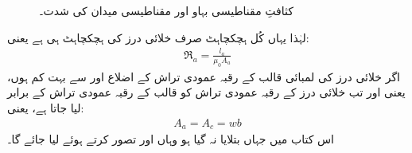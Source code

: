 \begin{figure}
%
\caption{کثافتِ مقناطیسی بہاو اور مقناطیسی میدان کی شدت۔}
\label{شکل_مقناطیسی__کثافت_مقناطیسی_بہاو_اور_شدت}
\end{figure}
لہٰذا یہاں کُل ہچکچاہٹ صرف خلائی درز کی ہچکچاہٹ ہی ہے یعنی:
\begin{align}
\Re_a=\frac{l_a}{\mu_0 A_a}
\end{align}
اگر خلائی درز کی لمبائی  قالب کے رقبہ عمودی تراش کے اضلاع  اور  سے بہت کم ہوں، یعنی  اور  تب خلائی درز کے رقبہ عمودی تراش  کو قالب کے رقبہ عمودی تراش  کے برابر لیا جاتا ہے، یعنی:
\begin{align}
A_a=A_c=w b
\end{align}
 اس کتاب میں جہاں بتلایا نہ گیا ہو وہاں  اور  تصور کرتے ہوئے  لیا جائے گا۔
 
